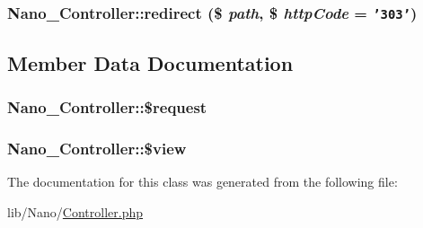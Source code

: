 \hypertarget{classNano__Controller_0c3e9896a90c3799ea6b0929e432a38e}{
\subsubsection[{redirect}]{\setlength{\rightskip}{0pt plus 5cm}Nano\_\-Controller::redirect (\$ {\em path}, \/  \$ {\em httpCode} = {\tt '303'})}}
\label{classNano__Controller_0c3e9896a90c3799ea6b0929e432a38e}




\subsection{Member Data Documentation}
\hypertarget{classNano__Controller_1349bb9187549c64ee682c03c39bb33a}{
\subsubsection[{\$request}]{\setlength{\rightskip}{0pt plus 5cm}Nano\_\-Controller::\$request}}
\label{classNano__Controller_1349bb9187549c64ee682c03c39bb33a}


\hypertarget{classNano__Controller_fe14332374580357e2e2f0621441f48b}{
\subsubsection[{\$view}]{\setlength{\rightskip}{0pt plus 5cm}Nano\_\-Controller::\$view}}
\label{classNano__Controller_fe14332374580357e2e2f0621441f48b}




The documentation for this class was generated from the following file:\begin{CompactItemize}
\item 
lib/Nano/\hyperlink{Controller_8php}{Controller.php}\end{CompactItemize}
